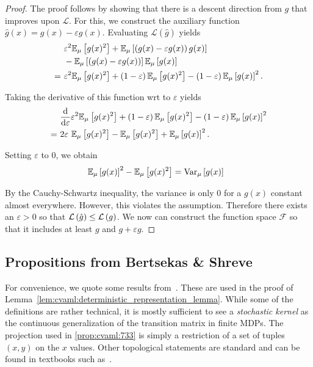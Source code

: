 \begin{proof}
The proof follows by showing that there is a descent direction from $g$ that improves upon $\mathcal{L}$. For this, we construct the auxiliary function $\hat{g}(x) = g(x) - \varepsilon g(x)$.
Evaluating $\mathcal{L}(\hat{g})$  yields 
\begin{align}
     &~\varepsilon^2 \mathbb{E}_\mu\left[ g(x)^2 \right] + \mathbb{E}_\mu\left[ \left( g(x) - \varepsilon g(x) \right) g(x) \right] \\
     &~- \mathbb{E}_\mu\left[ \left( g(x) - \varepsilon g(x) \right) \right]\mathbb{E}_\mu\left[ g(x) \right]\\
     =&~\varepsilon^2 \mathbb{E}_\mu\left[ g(x)^2 \right] + \left( 1-\varepsilon \right)\mathbb{E}_\mu\left[ g(x)^2 \right] - \left( 1 - \varepsilon \right) \mathbb{E}_\mu\left[ g(x) \right]^2.
\end{align}

Taking the derivative of this function wrt to $\varepsilon$ yields
\begin{align}
     &~\frac{\mathrm{d}}{\mathrm{d} \varepsilon}\varepsilon^2 \mathbb{E}_\mu\left[ g(x)^2 \right] + \left( 1-\varepsilon \right)\mathbb{E}_\mu\left[ g(x)^2 \right] - \left( 1 - \varepsilon \right) \mathbb{E}_\mu\left[ g(x) \right]^2\\
     =&~2\varepsilon~\mathbb{E}_\mu\left[ g(x)^2 \right] -\mathbb{E}_\mu\left[ g(x)^2 \right] + \mathbb{E}_\mu\left[ g(x) \right]^2.
\end{align}

Setting $\varepsilon$ to 0, we obtain
\begin{align}
     &~\mathbb{E}_\mu\left[ g(x) \right]^2 - \mathbb{E}_\mu\left[ g(x)^2 \right] = \text{Var}_\mu\left[ g(x) \right]
\end{align}

By the Cauchy-Schwartz inequality, the variance is only $0$ for a $g(x)$ constant almost everywhere. However, this violates the assumption.
Therefore there exists an $\varepsilon > 0$ so that $\mathcal{L}\left( \hat{g} \right) \leq \mathcal{L}\left( g \right)$.
We now can construct the function space $\mathcal{F}$ so that it includes at least $g$ and $g + \varepsilon g.$

\end{proof}

\subsection{Propositions from Bertsekas \& Shreve}
\label{sec:cvaml:bertsekas}

For convenience, we quote some results from~\textcite{bertsekasshreve1978}.
These are used in the proof of Lemma~\ref{lem:cvaml:deterministic_representation_lemma}.
While some of the definitions are rather technical, it is mostly sufficient to see a \emph{stochastic kernel} as the continuous generalization of the transition matrix in finite MDPs.
The projection used in \autoref{prop:cvaml:733} is simply a restriction of a set of tuples $(x,y)$ on the $x$ values.
Other topological statements are standard and can be found in textbooks such as~\textcite{munkres2018}.


